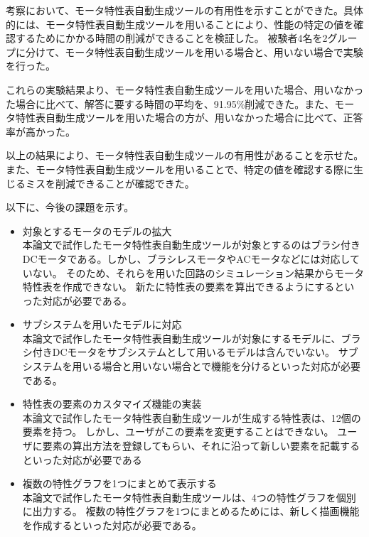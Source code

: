 考察において、モータ特性表自動生成ツールの有用性を示すことができた。具体的には、モータ特性表自動生成ツールを用いることにより、性能の特定の値を確認するためにかかる時間の削減ができることを検証した。
被験者4名を2グループに分けて、モータ特性表自動生成ツールを用いる場合と、用いない場合で実験を行った。

これらの実験結果より、モータ特性表自動生成ツールを用いた場合、用いなかった場合に比べて、解答に要する時間の平均を、91.95\%削減できた。また、モータ特性表自動生成ツールを用いた場合の方が、用いなかった場合に比べて、正答率が高かった。

以上の結果により、モータ特性表自動生成ツールの有用性があることを示せた。また、モータ特性表自動生成ツールを用いることで、特定の値を確認する際に生じるミスを削減できることが確認できた。


以下に、今後の課題を示す。

\begin{itemize}
  \item 対象とするモータのモデルの拡大\\
    本論文で試作したモータ特性表自動生成ツールが対象とするのはブラシ付きDCモータである。しかし、ブラシレスモータやACモータなどには対応していない。
    そのため、それらを用いた回路のシミュレーション結果からモータ特性表を作成できない。
    新たに特性表の要素を算出できるようにするといった対応が必要である。

\item サブシステムを用いたモデルに対応\\
本論文で試作したモータ特性表自動生成ツールが対象にするモデルに、ブラシ付きDCモータをサブシステムとして用いるモデルは含んでいない。
サブシステムを用いる場合と用いない場合とで機能を分けるといった対応が必要である。

\item 特性表の要素のカスタマイズ機能の実装\\
本論文で試作したモータ特性表自動生成ツールが生成する特性表は、12個の要素を持つ。
  しかし、ユーザがこの要素を変更することはできない。
  ユーザに要素の算出方法を登録してもらい、それに沿って新しい要素を記載するといった対応が必要である

    
\item 複数の特性グラフを1つにまとめて表示する\\
本論文で試作したモータ特性表自動生成ツールは、4つの特性グラフを個別に出力する。
複数の特性グラフを1つにまとめるためには、新しく描画機能を作成するといった対応が必要である。


\end{itemize}



